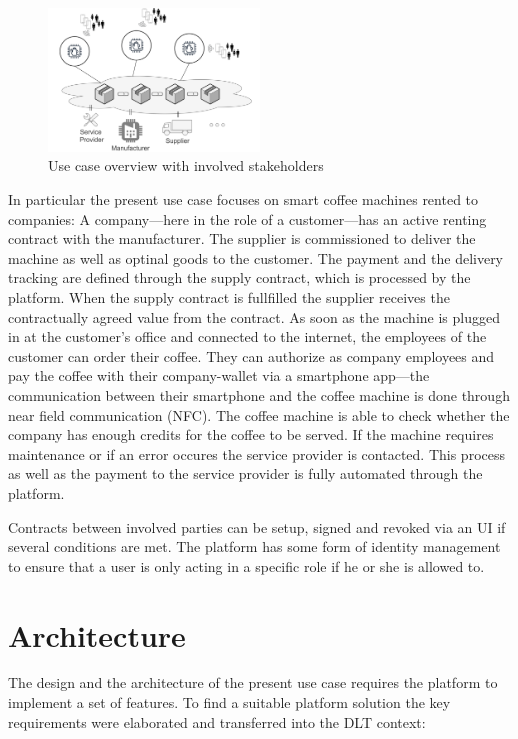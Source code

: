 \documentclass[conference]{IEEEtran}
\begin{document}
\begin{figure}[hbt]
 \centering
 \includegraphics[width=0.5\textwidth]{media/overview.png}
 \caption{Use case overview with involved stakeholders}
 \label{fig:overview}
\end{figure}

In particular the present use case focuses on smart coffee machines rented to companies: A company---here in the role of a customer---has an active renting contract with the manufacturer. The supplier is commissioned to deliver the machine as well as optinal goods to the customer. The payment and the delivery tracking are defined through the supply contract, which is processed by the platform. When the supply contract is fullfilled the supplier receives the contractually agreed value from the contract.
As soon as the machine is plugged in at the customer's office and connected to the internet, the employees of the customer can order their coffee. They can authorize as company employees and pay the coffee with their company-wallet via a smartphone app---the communication between their smartphone and the coffee machine is done through near field communication (NFC). The coffee machine is able to check whether the company has enough credits for the coffee to be served. If the machine requires maintenance or if an error occures the service provider is contacted. This process as well as the payment to the service provider is fully automated through the platform.

Contracts between involved parties can be setup, signed and revoked via an UI if several conditions are met. The platform has some form of identity management to ensure that a user is only acting in a specific role if he or she is allowed to. 

\section{Architecture}
The design and the architecture of the present use case requires the platform to implement a set of features. To find a suitable platform solution the key requirements were elaborated and transferred into the DLT context:
\end{document}
